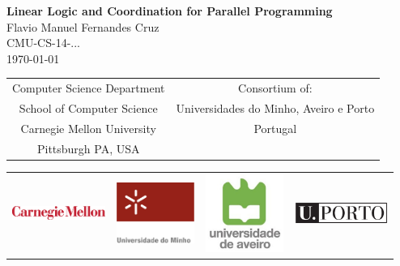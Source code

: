 


\thispagestyle{empty}

\begin{center}
{\huge \bf 
   Linear Logic and Coordination for Parallel Programming
}
\vspace{.25in}
{\LARGE
\\Flavio Manuel Fernandes Cruz\\}
\vspace{.25in}
{\large 
 CMU-CS-14-...
\\ \today \\}
 \vspace{.5in}

\setlength{\tabcolsep}{2em}
{\large
\begin{tabular}{cc}
\\ Computer Science Department & Consortium of:   \\
School of Computer Science & Universidades do Minho,  Aveiro e Porto \\
Carnegie Mellon University & Portugal \\
Pittsburgh PA, USA &  \\
\end{tabular}
}

\begin{tabular}{cccc}
\\ \includegraphics[width=1.2in]{logos/cmu.eps} & \includegraphics[width=1.0in]{logos/um.jpg}  & \includegraphics[width=1.0in]{logos/ua.jpg} & \includegraphics[width=1.2in]{logos/up.eps} \\
\end{tabular}




\end{center}
